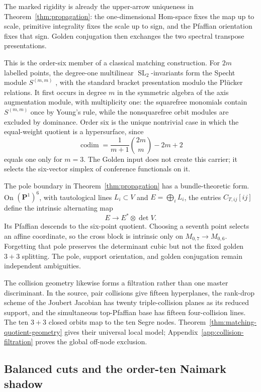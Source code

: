 \documentclass[11pt]{article}
\theoremstyle{definition}
\theoremstyle{remark}
\begin{document}
The marked rigidity is already the upper-arrow uniqueness in
Theorem~\ref{thm:propagation}: the one-dimensional Hom-space fixes the map
up to scale, primitive integrality fixes the scale up to sign, and the
Pfaffian orientation fixes that sign.  Golden conjugation then exchanges
the two spectral transpose presentations.

This is the order-six member of a classical matching construction.  For
\(2m\) labelled points, the degree-one multilinear
\(\operatorname{SL}_2\)-invariants form the Specht module \(S^{(m,m)}\)
\cite[Section~1]{HMSV}, with the standard bracket presentation modulo the
Pl\"ucker relations.  It first occurs in degree \(m\) in the symmetric algebra of
the axis augmentation module, with multiplicity one: the squarefree
monomials contain \(S^{(m,m)}\) once by Young's rule, while the
nonsquarefree orbit modules are excluded by dominance.  Order six is the
unique nontrivial case in which the equal-weight quotient is a hypersurface,
since
\[
 \operatorname{codim}=\frac1{m+1}\binom{2m}{m}-2m+2
\]
equals one only for \(m=3\).  The Golden input does not create this carrier;
it selects the six-vector simplex of conference functionals on it.

The pole boundary in Theorem~\ref{thm:propagation} has a bundle-theoretic
form.  On \((\mathbf P^1)^6\), with tautological lines
\(L_i\subset V\) and \(E=\bigoplus_iL_i\), the entries
\(C_{T,ij}[ij]\) define the intrinsic alternating map
\[
 E\longrightarrow E^*\otimes\det V.
\]
Its Pfaffian descends to the six-point quotient.  Choosing a seventh point
selects an affine coordinate, so the cross block is intrinsic only on
\(M_{0,7}\to M_{0,6}\).  Forgetting that pole preserves the determinant
cubic but not the fixed golden \(3+3\) splitting.  The pole, support
orientation, and golden conjugation remain independent ambiguities.

The collision geometry likewise forms a filtration rather than one master
discriminant.  In the source, pair collisions give fifteen hyperplanes,
the rank-drop scheme of the Joubert Jacobian has twenty triple-collision
planes as its reduced support, and the simultaneous top-Pfaffian base has
fifteen four-collision lines.  The ten \(3+3\) closed orbits map to the ten
Segre nodes.  Theorem~\ref{thm:matching-quotient-geometry} gives their
universal local model; Appendix~\ref{app:collision-filtration} proves the
global off-node exclusion.

\subsection{Balanced cuts and the order-ten Naimark shadow}
\end{document}
